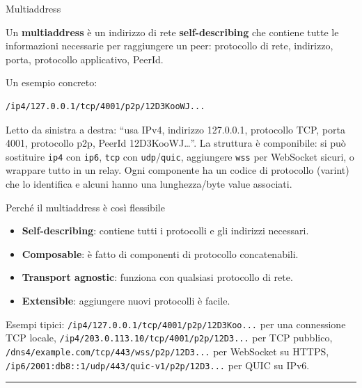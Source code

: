\documentclass[
  italian,
  openany]{book}
\providecommand{\tightlist}{%
  \setlength{\itemsep}{0pt}\setlength{\parskip}{0pt}}
\begin{document}
\begin{calloutdefinition}{Multiaddress}

Un \textbf{multiaddress} è un indirizzo di rete \textbf{self-describing}
che contiene tutte le informazioni necessarie per raggiungere un peer:
protocollo di rete, indirizzo, porta, protocollo applicativo, PeerId.

\end{calloutdefinition}

Un esempio concreto:

\begin{verbatim}
/ip4/127.0.0.1/tcp/4001/p2p/12D3KooWJ...
\end{verbatim}

Letto da sinistra a destra: ``usa IPv4, indirizzo 127.0.0.1, protocollo
TCP, porta 4001, protocollo p2p, PeerId 12D3KooWJ\ldots{}''. La
struttura è componibile: si può sostituire \texttt{ip4} con
\texttt{ip6}, \texttt{tcp} con \texttt{udp}/\texttt{quic}, aggiungere
\texttt{wss} per WebSocket sicuri, o wrappare tutto in un relay. Ogni
componente ha un codice di protocollo (varint) che lo identifica e
alcuni hanno una lunghezza/byte value associati.

\begin{callouttip}{Perché il multiaddress è così flessibile}

\begin{itemize}
\tightlist
\item
  \textbf{Self-describing}: contiene tutti i protocolli e gli indirizzi
  necessari.
\item
  \textbf{Composable}: è fatto di componenti di protocollo
  concatenabili.
\item
  \textbf{Transport agnostic}: funziona con qualsiasi protocollo di
  rete.
\item
  \textbf{Extensible}: aggiungere nuovi protocolli è facile.
\end{itemize}

\end{callouttip}

Esempi tipici: \texttt{/ip4/127.0.0.1/tcp/4001/p2p/12D3Koo...} per una
connessione TCP locale, \texttt{/ip4/203.0.113.10/tcp/4001/p2p/12D3...}
per TCP pubblico, \texttt{/dns4/example.com/tcp/443/wss/p2p/12D3...} per
WebSocket su HTTPS,
\texttt{/ip6/2001:db8::1/udp/443/quic-v1/p2p/12D3...} per QUIC su IPv6.

\begin{center}\rule{0.5\linewidth}{0.5pt}\end{center}
\end{document}
